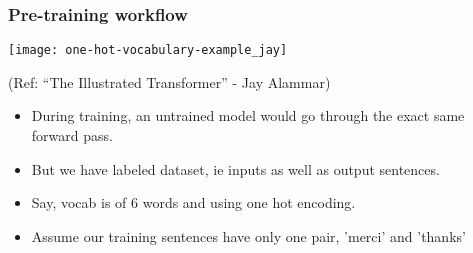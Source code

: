 \begin{frame}[fragile]\frametitle{Pre-training workflow}

\begin{center}
\texttt{[image: one-hot-vocabulary-example\_jay]}


{\tiny (Ref: ``The Illustrated Transformer'' - Jay Alammar)}
\end{center}		


\begin{itemize}
\item During training, an untrained model would go through the exact same forward pass. 
\item  But we have labeled dataset, ie inputs as well as output sentences. 
\item Say, vocab is of 6 words and using one hot encoding.
\item Assume our training sentences have only one pair, 'merci' and 'thanks'
\end{itemize}

\end{frame}

